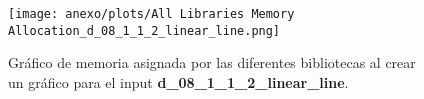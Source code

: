 
{
    \begin{figure}[H]
        \centering
        \texttt{[image: anexo/plots/All Libraries Memory Allocation\_d\_08\_1\_1\_2\_linear\_line.png]}
        \caption[]{Gráfico de memoria asignada por las diferentes bibliotecas al crear un gráfico para el input \textbf{d\_08\_1\_1\_2\_linear\_line}.}
        \label{fig:all_libraries_memory_allocation_plot_1}
    \end{figure}
}